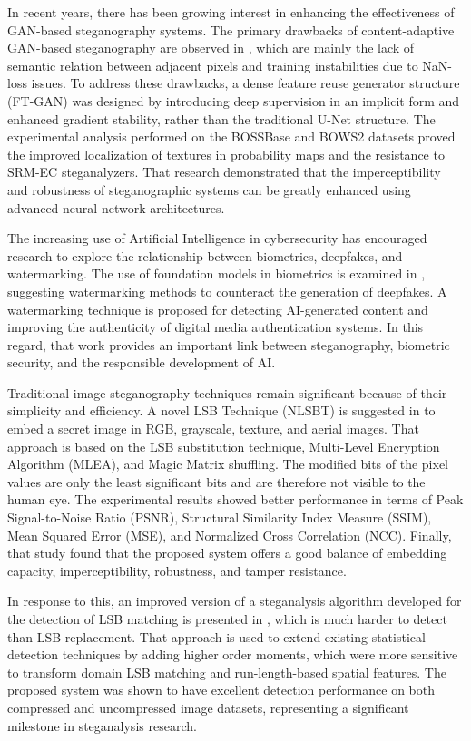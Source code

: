 \documentclass[conference]{IEEEtran}
\begin{document}
In recent years, there has been growing interest in enhancing the effectiveness of GAN-based steganography systems. The primary drawbacks of content-adaptive GAN-based steganography are observed in \cite{fadhl2024gan}, which are mainly the lack of semantic relation between adjacent pixels and training instabilities due to NaN-loss issues. To address these drawbacks, a dense feature reuse generator structure (FT-GAN) was designed by introducing deep supervision in an implicit form and enhanced gradient stability, rather than the traditional U-Net structure. The experimental analysis performed on the BOSSBase and BOWS2 datasets proved the improved localization of textures in probability maps and the resistance to SRM-EC steganalyzers. That research demonstrated that the imperceptibility and robustness of steganographic systems can be greatly enhanced using advanced neural network architectures.

The increasing use of Artificial Intelligence in cybersecurity has encouraged research to explore the relationship between biometrics, deepfakes, and watermarking. The use of foundation models in biometrics is examined in \cite{shahreza2025foundation}, suggesting watermarking methods to counteract the generation of deepfakes. A watermarking technique is proposed for detecting AI-generated content and improving the authenticity of digital media authentication systems. In this regard, that work provides an important link between steganography, biometric security, and the responsible development of AI.

Traditional image steganography techniques remain significant because of their simplicity and efficiency. A novel LSB Technique (NLSBT) is suggested in \cite{rahman2022novel} to embed a secret image in RGB, grayscale, texture, and aerial images. That approach is based on the LSB substitution technique, Multi-Level Encryption Algorithm (MLEA), and Magic Matrix shuffling. The modified bits of the pixel values are only the least significant bits and are therefore not visible to the human eye. The experimental results showed better performance in terms of Peak Signal-to-Noise Ratio (PSNR), Structural Similarity Index Measure (SSIM), Mean Squared Error (MSE), and Normalized Cross Correlation (NCC). Finally, that study found that the proposed system offers a good balance of embedding capacity, imperceptibility, robustness, and tamper resistance.

In response to this, an improved version of a steganalysis algorithm developed for the detection of LSB matching is presented in \cite{yu2008improved}, which is much harder to detect than LSB replacement. That approach is used to extend existing statistical detection techniques by adding higher order moments, which were more sensitive to transform domain LSB matching and run-length-based spatial features. The proposed system was shown to have excellent detection performance on both compressed and uncompressed image datasets, representing a significant milestone in steganalysis research.
\end{document}
